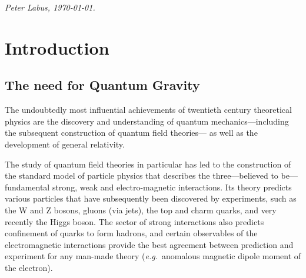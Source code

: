 \documentclass[11pt]{book} %
\newcommand\eg{\textit{e.g.}\ }
\numberwithin{equation}{chapter}
\begin{document}
\begin{flushright}
  \textit{Peter Labus, \monthyeardate\today.}
\end{flushright}

\makeatletter
\@openrighttrue
\makeatother


\pagestyle{empty} %

\tableofcontents %

\pagestyle{fancy} %



\chapter*{Introduction}

\section*{The need for Quantum Gravity}


The undoubtedly most influential achievements of twentieth century theoretical physics
are the discovery and understanding of
quantum mechanics---including the subsequent construction of quantum field theories---%
as well as the development of general relativity.

The study of quantum field theories in particular has led to the construction
of the standard model of particle physics that describes the three---believed to be---fundamental
strong, weak and electro-magnetic interactions.
Its theory predicts various particles
that have subsequently been discovered by experiments,
such as the W and Z bosons, gluons (via jets), the top and charm quarks, and very recently the Higgs boson.
The sector of strong interactions also predicts confinement of quarks to form hadrons, and
certain observables of the electromagnetic interactions provide the best agreement between
prediction and experiment for any man-made theory (\eg anomalous magnetic dipole moment of the electron).
\end{document}
